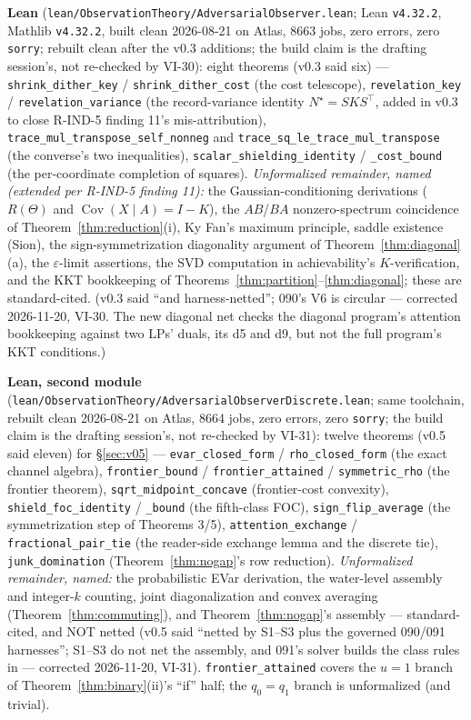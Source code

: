 \documentclass[11pt]{article}
\theoremstyle{definition}
\begin{document}
\textbf{Lean} (\texttt{lean/ObservationTheory/AdversarialObserver.lean};
Lean \texttt{v4.32.2}, Mathlib \texttt{v4.32.2}, built clean
2026-08-21 on Atlas, 8663 jobs, zero errors, zero \texttt{sorry};
rebuilt clean after the v0.3 additions; the build claim is the
drafting session's, not re-checked by VI-30): eight theorems (v0.3
said six) ---
\texttt{shrink\_dither\_key} / \texttt{shrink\_dither\_cost} (the
cost telescope), \texttt{revelation\_key} /
\texttt{revelation\_variance} (the record-variance identity
$N^\star = SKS^\top$, added in v0.3 to close R-IND-5 finding 11's
mis-attribution), \texttt{trace\_mul\_transpose\_self\_nonneg} and
\texttt{trace\_sq\_le\_trace\_mul\_transpose} (the converse's two
inequalities), \texttt{scalar\_shielding\_identity} /
\texttt{\_cost\_bound} (the per-coordinate completion of squares).
\emph{Unformalized remainder, named (extended per R-IND-5 finding
11):} the Gaussian-conditioning derivations ($R(\Theta)$ and
$\operatorname{Cov}(X\mid A) = I-K$), the $AB$/$BA$ nonzero-spectrum
coincidence of Theorem~\ref{thm:reduction}(i), Ky Fan's maximum
principle, saddle existence (Sion), the sign-symmetrization
diagonality argument of Theorem~\ref{thm:diagonal}(a), the
$\varepsilon$-limit assertions, the SVD computation in
achievability's $K$-verification, and the KKT bookkeeping of
Theorems~\ref{thm:partition}--\ref{thm:diagonal}; these are
standard-cited. (v0.3 said ``and harness-netted''; 090's V6 is circular
--- corrected 2026-11-20, VI-30. The new diagonal net checks the
diagonal program's attention bookkeeping against two LPs' duals, its d5
and d9, but not the full program's KKT conditions.)

\textbf{Lean, second module}
(\texttt{lean/ObservationTheory/AdversarialObserverDiscrete.lean};
same toolchain, rebuilt clean 2026-08-21 on Atlas, 8664 jobs, zero
errors, zero \texttt{sorry}; the build claim is the drafting session's,
not re-checked by VI-31): twelve theorems (v0.5 said eleven) for
\S\ref{sec:v05} ---
\texttt{evar\_closed\_form} / \texttt{rho\_closed\_form} (the exact
channel algebra), \texttt{frontier\_bound} /
\texttt{frontier\_attained} / \texttt{symmetric\_rho} (the frontier
theorem), \texttt{sqrt\_midpoint\_concave} (frontier-cost
convexity), \texttt{shield\_foc\_identity} / \texttt{\_bound} (the
fifth-class FOC), \texttt{sign\_flip\_average} (the symmetrization
step of Theorems 3/5), \texttt{attention\_exchange} /
\texttt{fractional\_pair\_tie} (the reader-side exchange lemma and
the discrete tie), \texttt{junk\_domination}
(Theorem~\ref{thm:nogap}'s row reduction). \emph{Unformalized
remainder, named:} the probabilistic EVar derivation, the
water-level assembly and integer-$k$ counting, joint
diagonalization and convex averaging (Theorem~\ref{thm:commuting}),
and Theorem~\ref{thm:nogap}'s assembly --- standard-cited, and NOT
netted (v0.5 said ``netted by S1--S3 plus the governed 090/091
harnesses''; S1--S3 do not net the assembly, and 091's solver builds
the class rules in --- corrected 2026-11-20, VI-31).
\texttt{frontier\_attained} covers the $u=1$ branch of
Theorem~\ref{thm:binary}(ii)'s ``if'' half; the $q_0=q_1$ branch is
unformalized (and trivial).
\end{document}
